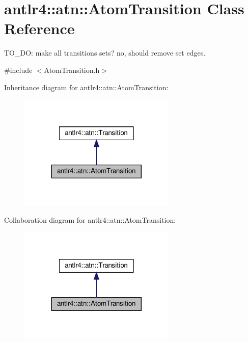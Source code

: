 \hypertarget{classantlr4_1_1atn_1_1AtomTransition}{}\section{antlr4\+:\+:atn\+:\+:Atom\+Transition Class Reference}
\label{classantlr4_1_1atn_1_1AtomTransition}


T\+O\+\_\+\+DO\+: make all transitions sets? no, should remove set edges.  




{\ttfamily \#include $<$Atom\+Transition.\+h$>$}



Inheritance diagram for antlr4\+:\+:atn\+:\+:Atom\+Transition\+:
\nopagebreak
\begin{figure}[H]
\begin{center}
\leavevmode
\includegraphics[width=212pt]{classantlr4_1_1atn_1_1AtomTransition__inherit__graph}
\end{center}
\end{figure}


Collaboration diagram for antlr4\+:\+:atn\+:\+:Atom\+Transition\+:
\nopagebreak
\begin{figure}[H]
\begin{center}
\leavevmode
\includegraphics[width=212pt]{classantlr4_1_1atn_1_1AtomTransition__coll__graph}
\end{center}
\end{figure}
